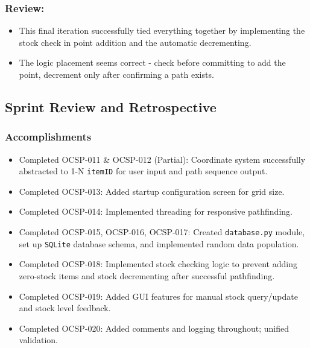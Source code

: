 \subsubsection{Review:}
\begin{itemize}
	\item This final iteration successfully tied everything together by implementing the stock check in point addition and the automatic decrementing.
	\item The logic placement seems correct - check before committing to add the point, decrement only after confirming a path exists.
\end{itemize}

\clearpage
\subsection{Sprint Review and Retrospective}

\subsubsection{Accomplishments}
\begin{itemize}
	\item Completed OCSP-011 \& OCSP-012 (Partial): Coordinate system successfully abstracted to 1-N \verb|itemID| for user input and path sequence output.
	\item Completed OCSP-013: Added startup configuration screen for grid size.
	\item Completed OCSP-014: Implemented threading for responsive pathfinding.
	\item Completed OCSP-015, OCSP-016, OCSP-017: Created \verb|database.py| module, set up \verb|SQLite| database schema, and implemented random data population.
	\item Completed OCSP-018: Implemented stock checking logic to prevent adding zero-stock items and stock decrementing after successful pathfinding.
	\item Completed OCSP-019: Added GUI features for manual stock query/update and stock level feedback.
	\item Completed OCSP-020: Added comments and logging throughout; unified validation.
\end{itemize}

